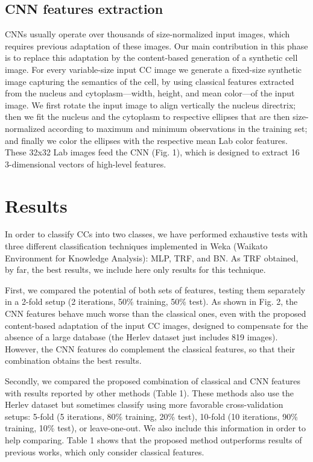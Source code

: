 \documentclass{bmcart}
\begin{document}
\subsection*{CNN features extraction}
CNNs usually operate over thousands of size-normalized input images, which requires previous adaptation of these images. Our main contribution in this phase is to replace this adaptation by the content-based generation of a synthetic cell image. For every variable-size input CC image we generate a fixed-size synthetic image capturing the semantics of the cell, by using classical features extracted from the nucleus and cytoplasm---width, height, and mean color---of the input image. We first rotate the input image to align vertically the nucleus directrix; then we fit the nucleus and the cytoplasm to respective ellipses that are then size-normalized according to maximum and minimum observations in the training set; and finally we color the ellipses with the respective mean Lab color features. These 32x32 Lab images feed the CNN (Fig. 1), which is designed to extract 16 3-dimensional vectors of high-level features. 

\section*{Results}
In order to classify CCs into two classes, we have performed exhaustive tests with three different classification techniques implemented in Weka (Waikato Environment for Knowledge Analysis)\cite{14}: MLP, TRF, and BN. As TRF obtained, by far, the best results, we include here only results for this technique.	

First, we compared the potential of both sets of features, testing them separately in a 2-fold setup (2 iterations, 50\% training, 50\% test). As shown in Fig. 2, the CNN features behave much worse than the classical ones, even with the proposed content-based adaptation of the input CC images, designed to compensate for the absence of a large database (the Herlev dataset just includes 819 images). However, the CNN features do complement the classical features, so that their combination obtains the best results.

Secondly, we compared the proposed combination of classical and CNN features with results reported by other methods \cite{2,3,5,6,8,9} (Table 1). These methods also use the Herlev dataset but sometimes classify using more favorable cross-validation setups: 5-fold (5 iterations, 80\% training, 20\% test), 10-fold (10 iterations, 90\% training, 10\% test), or leave-one-out. We also include this information in order to help comparing. Table 1 shows that the proposed method outperforms results of previous works, which only consider classical features.
\end{document}
